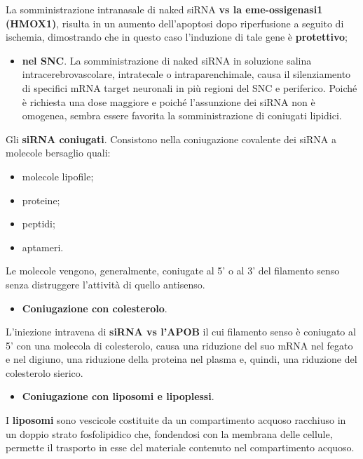 \documentclass[]{article}
\begin{document}
La somministrazione intranasale di naked siRNA \textbf{vs la
eme-ossigenasi1 (HMOX1)}, risulta in un aumento dell'apoptosi dopo
riperfusione a seguito di ischemia, dimostrando che in questo caso
l'induzione di tale gene è \textbf{protettivo};

\begin{itemize}
\itemsep1pt\parskip0pt
\item
  \textbf{nel SNC}. La somministrazione di naked siRNA in soluzione
  salina intracerebrovascolare, intratecale o intraparenchimale, causa
  il silenziamento di specifici mRNA target neuronali in più regioni del
  SNC e periferico. Poiché è richiesta una dose maggiore e poiché
  l'assunzione dei siRNA non è omogenea, sembra essere favorita la
  somministrazione di coniugati lipidici.
\end{itemize}

Gli \textbf{siRNA coniugati}. Consistono nella coniugazione covalente
dei siRNA a molecole bersaglio quali:

\begin{itemize}
\itemsep1pt\parskip0pt
\item
  molecole lipofile;
\item
  proteine;
\item
  peptidi;
\item
  aptameri.
\end{itemize}

Le molecole vengono, generalmente, coniugate al 5' o al 3' del filamento
senso senza distruggere l'attività di quello antisenso.

\begin{itemize}
\itemsep1pt\parskip0pt
\item
  \textbf{Coniugazione con colesterolo}.
\end{itemize}

L'iniezione intravena di \textbf{siRNA vs l'APOB} il cui filamento senso
è coniugato al 5' con una molecola di colesterolo, causa una riduzione
del suo mRNA nel fegato e nel digiuno, una riduzione della proteina nel
plasma e, quindi, una riduzione del colesterolo sierico.

\begin{itemize}
\itemsep1pt\parskip0pt
\item
  \textbf{Coniugazione con liposomi e lipoplessi}.
\end{itemize}

I \textbf{liposomi} sono vescicole costituite da un compartimento
acquoso racchiuso in un doppio strato fosfolipidico che, fondendosi con
la membrana delle cellule, permette il trasporto in esse del materiale
contenuto nel compartimento acquoso.
\end{document}
